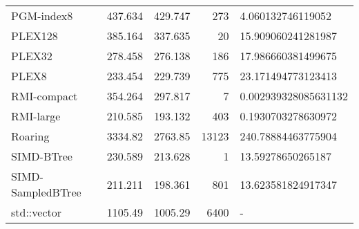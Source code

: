 \begin{tabular}{lrrrl}
 PGM-index8        &                437.634 &               429.747 &          273 & 4.060132746119052    \\
 PLEX128           &                385.164 &               337.635 &           20 & 15.909060241281987   \\
 PLEX32            &                278.458 &               276.138 &          186 & 17.986660381499675   \\
 PLEX8             &                233.454 &               229.739 &          775 & 23.171494773123413   \\
 RMI-compact       &                354.264 &               297.817 &            7 & 0.002939328085631132 \\
 RMI-large         &                210.585 &               193.132 &          403 & 0.1930703278630972   \\
 Roaring           &               3334.82  &              2763.85  &        13123 & 240.78884463775904   \\
 SIMD-BTree        &                230.589 &               213.628 &            1 & 13.59278650265187    \\
 SIMD-SampledBTree &                211.211 &               198.361 &          801 & 13.623581824917347   \\
 std::vector       &               1105.49  &              1005.29  &         6400 & -                    \\
\hline
\end{tabular}
